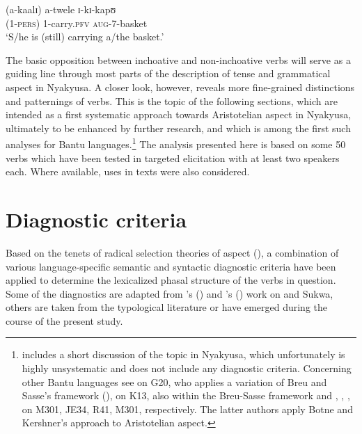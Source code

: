 \begin{exe}
\ex \label{exInchoativeCarryTwala}\gll \textup{(}a-kaalɪ\textup{)} a-twele ɪ-kɪ-kapʊ\\
(1-\textsc{pers}) 1-carry.\textsc{pfv} \textsc{aug}-7-basket\\
\glt `S/he is (still) carrying a/the basket.'
\end{exe}

The basic opposition between inchoative and non-inchoative verbs will serve as a guiding line through most parts of the description of tense and grammatical aspect in Nyakyusa. A closer look, however, reveals more fine-grained distinctions and patternings of verbs. This is the topic of the following sections, which are intended as a first systematic approach towards Aristotelian aspect in Nyakyusa, ultimately to be enhanced by further research, and which is among the first such analyses for Bantu languages.\footnote{\label{FootnoteCriticismLusekelo2013}\citet{LusekeloA2013} includes a short discussion of the topic in Nyakyusa, which unfortunately is highly unsystematic and does not include any diagnostic criteria. Concerning other Bantu languages see \citet{MretaA1998} on  G20, who applies a variation of Breu and Sasse's framework (), \citet{FleischA2000} on  K13, also within the Breu-Sasse framework and \citet{KershnerT2002}, \citet{BotneROchwadaHMarloM2006}, \citet{SeidelF2008}, \citet{BotneR2008} on  M301,  JE34,  R41,  M301, respectively. The latter authors apply Botne and Kershner's approach to Aristotelian aspect.} The analysis presented here is based on some 50 verbs which have been tested in targeted elicitation with at least two speakers each. Where available, uses in texts were also considered.
\section{Diagnostic criteria}\label{CriteriaClassificationOfVerbs}
Based on the tenets of radical selection theories of aspect (), a combination of various language-specific semantic and syntactic diagnostic criteria have been applied to determine the lexicalized phasal structure of the verbs in question. Some of the diagnostics are adapted from \citeauthor{BotneR2008}'s (\citeyear{BotneR2008}) and \citeauthor{KershnerT2002}'s (\citeyear{KershnerT2002}) work on  and Sukwa, others are taken from the typological literature or have emerged during the course of the present study.

